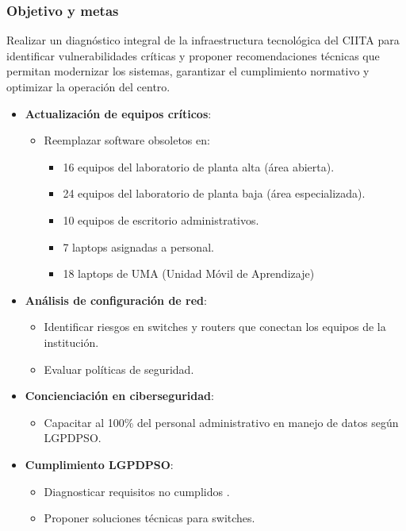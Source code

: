 \subsubsection{Objetivo y metas}

Realizar un diagnóstico integral de la infraestructura tecnológica del CIITA para identificar vulnerabilidades críticas y proponer recomendaciones técnicas que permitan modernizar los sistemas, garantizar el cumplimiento normativo y optimizar la operación del centro.

\begin{itemize}
	\item \textbf{Actualización de equipos críticos}:
	\begin{itemize}
		\item Reemplazar software obsoletos en:
		\begin{itemize}
			\item 16 equipos del laboratorio de planta alta (área abierta).
			\item 24 equipos del laboratorio de planta baja (área especializada).
			\item 10 equipos de escritorio administrativos.
			\item 7 laptops asignadas a personal.
			\item 18 laptops de UMA (Unidad Móvil de Aprendizaje)
		\end{itemize}
	\end{itemize}
	
	\item \textbf{Análisis de configuración de red}:
	\begin{itemize}
		\item Identificar riesgos en switches y routers que conectan los  equipos de la institución. 
		\item Evaluar políticas de seguridad.
	\end{itemize}
	
	
	\item \textbf{Concienciación en ciberseguridad}:
	\begin{itemize}
		\item Capacitar al 100\% del personal administrativo en manejo de datos según LGPDPSO.
	\end{itemize}
	
	\item \textbf{Cumplimiento LGPDPSO}:
	\begin{itemize}
		\item Diagnosticar requisitos no cumplidos .
		\item Proponer soluciones técnicas para switches.
	\end{itemize}
\end{itemize}
